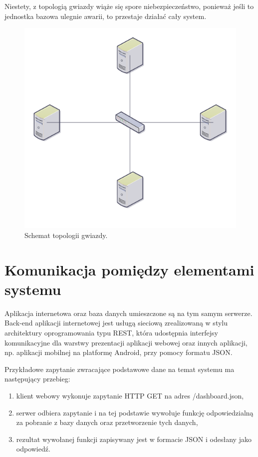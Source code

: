 \documentclass[eng,oneside]{mgr}
\begin{document}
Niestety, z topologią gwiazdy wiąże się spore niebezpieczeństwo, ponieważ jeśli to jednostka bazowa ulegnie awarii, to przestaje działać cały system. 

\begin{figure}[h]
\centering
\includegraphics[width=0.6\linewidth]{topologia_gwiazdy}
\caption{Schemat topologii gwiazdy.}
\label{fig:star-network}
\end{figure}

\section{Komunikacja pomiędzy elementami systemu} %
\label{sec:komunikacja_pomi_dzy_elementami_systemu}
Aplikacja internetowa oraz baza danych umieszczone są na tym samym serwerze. Back-end aplikacji internetowej jest usługą sieciową zrealizowaną w stylu architektury oprogramowania typu REST, która udostępnia interfejsy komunikacyjne dla warstwy prezentacji aplikacji webowej oraz innych aplikacji, np. aplikacji mobilnej na platformę Android, przy pomocy formatu JSON.

Przykładowe zapytanie zwracające podstawowe dane na temat systemu ma następujący przebieg:
\begin{enumerate}
	\item klient webowy wykonuje zapytanie HTTP GET na adres /dashboard.json,
	\item serwer odbiera zapytanie i na tej podstawie wywołuje funkcję odpowiedzialną za pobranie z bazy danych oraz przetworzenie tych danych, 
	\item rezultat wywołanej funkcji zapisywany jest w formacie JSON i odesłany jako odpowiedź.
\end{enumerate}
\end{document}
